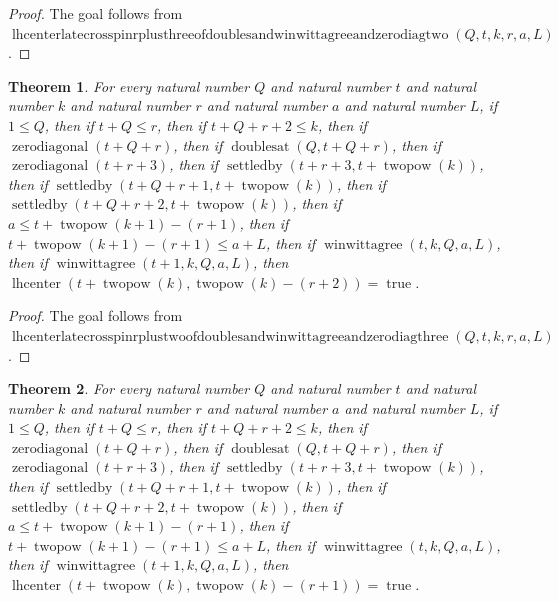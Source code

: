 \documentclass[11pt]{article}
\newtheorem{theorem}{Theorem}[section]
\theoremstyle{definition}
\begin{document}
\begin{proof}
The goal follows from \(\operatorname{lhcenterlatecrosspinrplusthreeofdoublesandwinwittagreeandzerodiagtwo}(Q, t, k, r, a, L)\).
\end{proof}
\begin{theorem}
\label{ll:paper:lhcenter-late-cross-pin-r-plus-two-of-doubles-and-winwittagree-and-zero-diag-three}
For every natural number \(Q\) and natural number \(t\) and natural number \(k\) and natural number \(r\) and natural number \(a\) and natural number \(L\), if \(1 \le Q\), then if \(t + Q \le r\), then if \(t + Q + r + 2 \le k\), then if \(\operatorname{zerodiagonal}(t + Q + r)\), then if \(\operatorname{doublesat}(Q, t + Q + r)\), then if \(\operatorname{zerodiagonal}(t + r + 3)\), then if \(\operatorname{settledby}(t + r + 3, t + \operatorname{twopow}(k))\), then if \(\operatorname{settledby}(t + Q + r + 1, t + \operatorname{twopow}(k))\), then if \(\operatorname{settledby}(t + Q + r + 2, t + \operatorname{twopow}(k))\), then if \(a \le t + \operatorname{twopow}(k + 1) - (r + 1)\), then if \(t + \operatorname{twopow}(k + 1) - (r + 1) \le a + L\), then if \(\operatorname{winwittagree}(t, k, Q, a, L)\), then if \(\operatorname{winwittagree}(t + 1, k, Q, a, L)\), then \(\operatorname{lhcenter}(t + \operatorname{twopow}(k), \operatorname{twopow}(k) - (r + 2)) = \operatorname{true}\).
\end{theorem}
\begin{proof}
The goal follows from \(\operatorname{lhcenterlatecrosspinrplustwoofdoublesandwinwittagreeandzerodiagthree}(Q, t, k, r, a, L)\).
\end{proof}
\begin{theorem}
\label{ll:paper:lhcenter-late-cross-pin-r-plus-one-of-doubles-and-winwittagree-and-zero-diag-three}
For every natural number \(Q\) and natural number \(t\) and natural number \(k\) and natural number \(r\) and natural number \(a\) and natural number \(L\), if \(1 \le Q\), then if \(t + Q \le r\), then if \(t + Q + r + 2 \le k\), then if \(\operatorname{zerodiagonal}(t + Q + r)\), then if \(\operatorname{doublesat}(Q, t + Q + r)\), then if \(\operatorname{zerodiagonal}(t + r + 3)\), then if \(\operatorname{settledby}(t + r + 3, t + \operatorname{twopow}(k))\), then if \(\operatorname{settledby}(t + Q + r + 1, t + \operatorname{twopow}(k))\), then if \(\operatorname{settledby}(t + Q + r + 2, t + \operatorname{twopow}(k))\), then if \(a \le t + \operatorname{twopow}(k + 1) - (r + 1)\), then if \(t + \operatorname{twopow}(k + 1) - (r + 1) \le a + L\), then if \(\operatorname{winwittagree}(t, k, Q, a, L)\), then if \(\operatorname{winwittagree}(t + 1, k, Q, a, L)\), then \(\operatorname{lhcenter}(t + \operatorname{twopow}(k), \operatorname{twopow}(k) - (r + 1)) = \operatorname{true}\).
\end{theorem}
\end{document}
